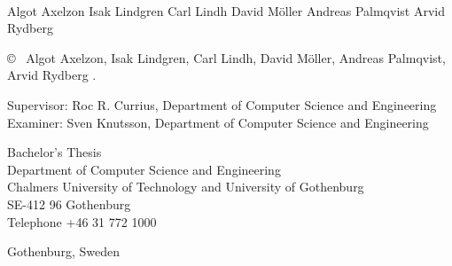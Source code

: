 \newpage
\thispagestyle{plain}
\vspace*{4.5cm}
\oneLineTitle\\
Algot Axelzon \setlength{\parskip}{1cm}
Isak Lindgren \setlength{\parskip}{1cm}
Carl Lindh \setlength{\parskip}{1cm}
David Möller \setlength{\parskip}{1cm}
Andreas Palmqvist \setlength{\parskip}{1cm}
Arvid Rydberg \setlength{\parskip}{1cm}

\copyright ~ Algot Axelzon, Isak Lindgren, Carl Lindh, David Möller, Andreas Palmqvist, Arvid Rydberg \the\year. \setlength{\parskip}{1cm}

Supervisor: Roc R. Currius, Department of Computer Science and Engineering\\
Examiner: Sven Knutsson, Department of Computer Science and Engineering \setlength{\parskip}{1cm}

Bachelor's Thesis \the\year\\	%
Department of Computer Science and Engineering\\
Chalmers University of Technology and University of Gothenburg\\
SE-412 96 Gothenburg\\
Telephone +46 31 772 1000 \setlength{\parskip}{0.5cm}

\vfill


Gothenburg, Sweden \the\year

